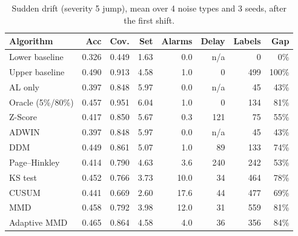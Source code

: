 \documentclass[11pt,a4paper]{article}
\begin{document}
\begin{table}[H]
\centering
\caption{Sudden drift (severity 5 jump), mean over 4 noise types and 3 seeds, after the first shift.}
\label{tab:sudden}
\small
\begin{tabular}{@{}lrrrrrrr@{}}
\toprule
Algorithm & Acc & Cov. & Set & Alarms & Delay & Labels & Gap \\
\midrule
Lower baseline & 0.326 & 0.449 & 1.63 & 0.0 & n/a & 0 & 0\% \\
Upper baseline & 0.490 & 0.913 & 4.58 & 1.0 & 0 & 499 & 100\% \\
AL only & 0.397 & 0.848 & 5.97 & 0.0 & n/a & 45 & 43\% \\
Oracle (5\%/80\%) & 0.457 & 0.951 & 6.04 & 1.0 & 0 & 134 & 81\% \\
Z-Score & 0.417 & 0.850 & 5.67 & 0.3 & 121 & 75 & 55\% \\
ADWIN & 0.397 & 0.848 & 5.97 & 0.0 & n/a & 45 & 43\% \\
DDM & 0.449 & 0.861 & 5.07 & 1.0 & 89 & 133 & 74\% \\
Page--Hinkley & 0.414 & 0.790 & 4.63 & 3.6 & 240 & 242 & 53\% \\
KS test & 0.452 & 0.766 & 3.73 & 10.0 & 34 & 464 & 78\% \\
CUSUM & 0.441 & 0.669 & 2.60 & 17.6 & 44 & 477 & 69\% \\
MMD & 0.458 & 0.792 & 3.98 & 12.0 & 31 & 559 & 81\% \\
Adaptive MMD & 0.465 & 0.864 & 4.58 & 4.0 & 36 & 356 & 84\% \\
\bottomrule
\end{tabular}
\end{table}
\end{document}
